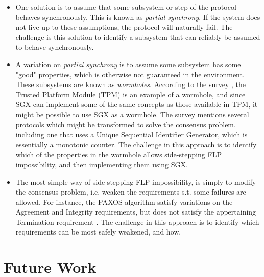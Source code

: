 \documentclass[12pt]{article}
\begin{document}
		\begin{itemize}
			\item One solution is to assume that some subsystem or step of the protocol behaves synchronously. This is known as \textit{partial synchrony}. If the system does not live up to these assumptions, the protocol will naturally fail. The challenge is this solution to identify a subsystem that can reliably be assumed to behave synchronously. 
			\item A variation on \textit{partial synchrony} is to assume some subsystem has some "good" properties, which is otherwise not guaranteed in the environment. These subsystems are known as \textit{wormholes}. According to the survey \cite{consensus-survey}, the Trusted Platform Module (TPM) is an example of a wormhole, and since SGX can implement some of the same concepts as those available in TPM, it might be possible to use SGX as a wormhole. The survey mentions several protocols which might be transformed to solve the consensus problem, including one that uses a Unique Sequential Identifier Generator, which is essentially a monotonic counter. The challenge in this approach is to identify which of the properties in the wormhole allows side-stepping FLP impossibility, and then implementing them using SGX.
			\item The most simple way of side-stepping FLP impossibility, is simply to modify the consensus problem, i.e. weaken the requirements s.t. some failures are allowed. For instance, the PAXOS algorithm \cite{paxos} satisfy variations on the Agreement and Integrity requirements, but does not satisfy the appertaining Termination requirement \cite{fast-byz-cons}. The challenge in this approach is to identify which requirements can be most safely weakened, and how.
		\end{itemize}
		
	\section{Future Work}
\end{document}
